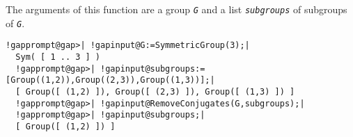 \documentclass[a4paper,11pt]{report}
\begin{document}
{{{ The arguments of this function are a group \mbox{\texttt{\mdseries\slshape G}} and a list \mbox{\texttt{\mdseries\slshape subgroups}} of subgroups of \mbox{\texttt{\mdseries\slshape G}}. 

 }

 

 
\begin{Verbatim}[commandchars=!@|,fontsize=\small,frame=single,label=Example]
  !gapprompt@gap>| !gapinput@G:=SymmetricGroup(3);|
  Sym( [ 1 .. 3 ] )
  !gapprompt@gap>| !gapinput@subgroups:=[Group((1,2)),Group((2,3)),Group((1,3))];|
  [ Group([ (1,2) ]), Group([ (2,3) ]), Group([ (1,3) ]) ]
  !gapprompt@gap>| !gapinput@RemoveConjugates(G,subgroups);|
  !gapprompt@gap>| !gapinput@subgroups;|
  [ Group([ (1,2) ]) ]
\end{Verbatim}
 }

 }

   
\end{document}
